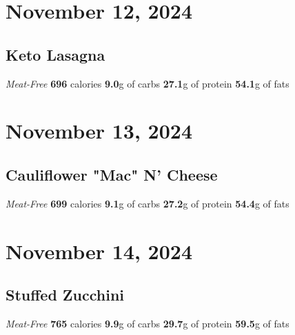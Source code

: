 \documentclass{article}%
\begin{document}
%
\section*{November 12, 2024}%
\label{sec:November12,2024}%
\begin{paracol}[1]{1}%
\sloppy%
\subsection*{Keto Lasagna}%
\label{subsec:KetoLasagna}%
\textit{Meat{-}Free}%
\newline%
\newline%
\textbf{696} calories%
\newline%
\textbf{9.0}g of carbs%
\newline%
\textbf{27.1}g of protein%
\newline%
\textbf{54.1}g of fats%
\newline%
\switchcolumn

%
\end{paracol}

%
\section*{November 13, 2024}%
\label{sec:November13,2024}%
\begin{paracol}[1]{1}%
\sloppy%
\subsection*{Cauliflower "Mac" N' Cheese}%
\label{subsec:CauliflowerMacNCheese}%
\textit{Meat{-}Free}%
\newline%
\newline%
\textbf{699} calories%
\newline%
\textbf{9.1}g of carbs%
\newline%
\textbf{27.2}g of protein%
\newline%
\textbf{54.4}g of fats%
\newline%
\switchcolumn

%
\end{paracol}

%
\section*{November 14, 2024}%
\label{sec:November14,2024}%
\begin{paracol}[1]{1}%
\sloppy%
\subsection*{Stuffed Zucchini}%
\label{subsec:StuffedZucchini}%
\textit{Meat{-}Free}%
\newline%
\newline%
\textbf{765} calories%
\newline%
\textbf{9.9}g of carbs%
\newline%
\textbf{29.7}g of protein%
\newline%
\textbf{59.5}g of fats%
\newline%
\switchcolumn

%
\end{paracol}
\end{document}
